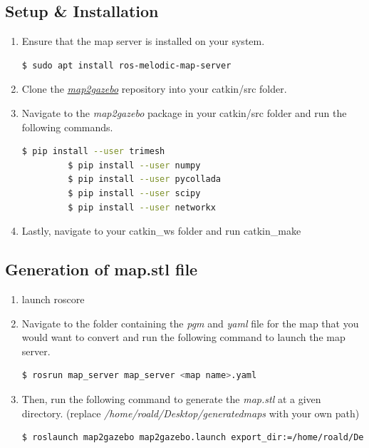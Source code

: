 \documentclass[11pt]{article}
\begin{document}
\subsection{Setup \& Installation}

\begin{enumerate}
 \item{
       Ensure that the map server is installed on your system.
       \begin{lstlisting}[language=bash]
     $ sudo apt install ros-melodic-map-server
       \end{lstlisting}
       }
 \item{
       Clone the \href{https://github.com/SynapseProgramming/map2gazebo.git
       }{\emph{map2gazebo}} repository into your catkin/src folder.

       }
 \item{
       Navigate to the \emph{map2gazebo} package in your catkin/src folder and run the following commands.

       \begin{lstlisting}[language=bash]
         $ pip install --user trimesh
         $ pip install --user numpy
         $ pip install --user pycollada
         $ pip install --user scipy
         $ pip install --user networkx
       \end{lstlisting}
       }
 \item{
       Lastly, navigate to your catkin\_ws folder and run catkin\_make
       }
\end{enumerate}

\subsection{Generation of map.stl file}

\begin{enumerate}
 \item{launch roscore}
 \item {
       Navigate to the folder containing the \emph{pgm} and \emph{yaml} file for the map that you would want to convert and run the following command to launch the map server.
       \begin{lstlisting}[language=bash]
        $ rosrun map_server map_server <map name>.yaml
       \end{lstlisting}
       }
 \item{
       Then, run the following command to generate the \emph{map.stl} at a given directory. (replace
       \emph{/home/roald/Desktop/generatedmaps} with your own path)

       \begin{lstlisting}[language=bash]
        $ roslaunch map2gazebo map2gazebo.launch export_dir:=/home/roald/Desktop/generatedmaps
        \end{lstlisting}
       }
\end{enumerate}
\end{document}
